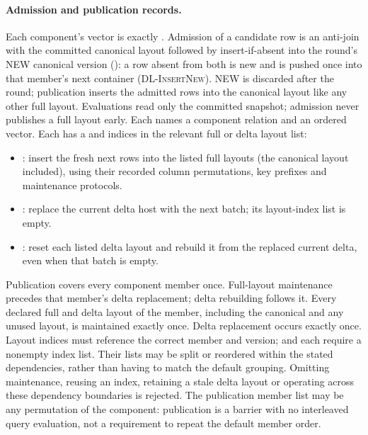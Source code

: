 \paragraph{Admission and publication records.} Each component's 
vector is exactly .
Admission of a candidate row is an anti-join with the committed canonical
layout followed by insert-if-absent into the round's NEW canonical version
(): a row absent from both is new and is pushed once into
that member's next container (\textsc{DL-InsertNew}). NEW is discarded after
the round; publication inserts the admitted rows into the canonical layout like
any other full layout.
Evaluations read only the committed snapshot; admission never publishes a
full layout early.
Each  names a component relation and an ordered
 vector. Each  has a  and
 indices in the relevant full or delta layout list:
\begin{itemize}
\item {}: insert the fresh next rows into the listed full
layouts (the canonical layout included), using their recorded column
permutations, key prefixes and maintenance protocols.
\item {}: replace the current delta host with the next batch;
its layout-index list is empty.
\item {}: reset each listed delta layout and rebuild it
from the replaced current delta, even when that batch is empty.
\end{itemize}
Publication covers every component member once. Full-layout maintenance
precedes that member's delta replacement; delta rebuilding
follows it. Every declared full and delta layout of the member, including the
canonical and any unused layout, is maintained exactly once. Delta
replacement occurs exactly once. Layout indices must reference the correct
member and version;  and  each require
a nonempty index list. Their lists may be split or reordered within the stated
dependencies, rather than having to match the default grouping.
Omitting maintenance, reusing an index, retaining a stale delta layout or
operating across these dependency boundaries is rejected.
The publication member list may be any permutation of the component:
publication is a barrier with no interleaved query evaluation, not a requirement
to repeat the default member order.

